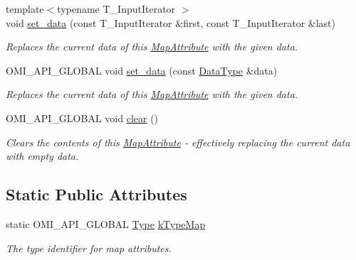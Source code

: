 \begin{DoxyCompactItemize}
{\footnotesize template$<$typename T\+\_\+\+Input\+Iterator $>$ }\\void \hyperlink{classomi_1_1_map_attribute_a301205039db6d6446920b6394f00e61a}{set\+\_\+data} (const T\+\_\+\+Input\+Iterator \&first, const T\+\_\+\+Input\+Iterator \&last)
\begin{DoxyCompactList}\small\item\em Replaces the current data of this \hyperlink{classomi_1_1_map_attribute}{Map\+Attribute} with the given data. \end{DoxyCompactList}\item 
O\+M\+I\+\_\+\+A\+P\+I\+\_\+\+G\+L\+O\+B\+AL void \hyperlink{classomi_1_1_map_attribute_a91f57783b4f26e58d980c5af53e6d1ca}{set\+\_\+data} (const \hyperlink{classomi_1_1_map_attribute_ac5a11b90e684944a18bcd18376d7eed1}{Data\+Type} \&data)
\begin{DoxyCompactList}\small\item\em Replaces the current data of this \hyperlink{classomi_1_1_map_attribute}{Map\+Attribute} with the given data. \end{DoxyCompactList}\item 
O\+M\+I\+\_\+\+A\+P\+I\+\_\+\+G\+L\+O\+B\+AL void \hyperlink{classomi_1_1_map_attribute_aa1c68fdaa6b87ea72bdd34889293b944}{clear} ()
\begin{DoxyCompactList}\small\item\em Clears the contents of this \hyperlink{classomi_1_1_map_attribute}{Map\+Attribute} -\/ effectively replacing the current data with empty data. \end{DoxyCompactList}\end{DoxyCompactItemize}
\subsection*{Static Public Attributes}
\begin{DoxyCompactItemize}
\item 
static O\+M\+I\+\_\+\+A\+P\+I\+\_\+\+G\+L\+O\+B\+AL \hyperlink{classomi_1_1_attribute_aae4992bc8d2b12679548909bc813eecf}{Type} \hyperlink{classomi_1_1_map_attribute_a2d55813e6394bea0e8e7ba00880a963b}{k\+Type\+Map}\hypertarget{classomi_1_1_map_attribute_a2d55813e6394bea0e8e7ba00880a963b}{}\label{classomi_1_1_map_attribute_a2d55813e6394bea0e8e7ba00880a963b}

\begin{DoxyCompactList}\small\item\em The type identifier for map attributes. \end{DoxyCompactList}\end{DoxyCompactItemize}
